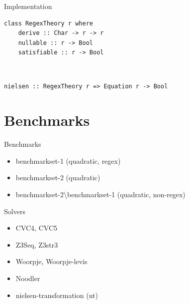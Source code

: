 \documentclass[xcolor=table]{beamer}
\begin{document}
\begin{frame}[fragile]{Implementation}
\begin{verbatim}
class RegexTheory r where
    derive :: Char -> r -> r
    nullable :: r -> Bool
    satisfiable :: r -> Bool
\end{verbatim}

\pause
~\\

\begin{verbatim}
nielsen :: RegexTheory r => Equation r -> Bool
\end{verbatim}
\end{frame}

\section{Benchmarks}
\begin{frame}{Benchmarks}
\begin{itemize}
    \pause
    \item benchmarkset-1 (quadratic, regex)
    \pause
    \item benchmarkset-2 (quadratic)
    \pause
    \item benchmarkset-2\:\textbackslash\:benchmarkset-1 (quadratic, non-regex)
\end{itemize}
    
\end{frame}

\begin{frame}{Solvers}
\begin{itemize}
    \pause
    \item CVC4, CVC5
    \pause
    \item Z3Seq, Z3str3
    \pause
    \item Woorpje, Woorpje-levis
    \pause
    \item Noodler
    \pause
    \item nielsen-transformation (nt)
\end{itemize}
\end{frame}
\end{document}
